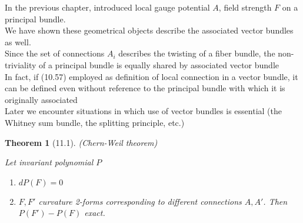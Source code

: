 \documentclass[twoside]{amsart}
\newtheorem{theorem}{Theorem}
\begin{document}
In the previous chapter, introduced local gauge potential $A$, field strength $F$ on a principal bundle.  \\
\quad We have shown these geometrical objects describe the associated vector bundles as well. \\
\quad Since the set of connections $A_i$ describes the twisting of a fiber bundle, the non-triviality of a principal bundle is equally shared by associated vector bundle \\
\quad \quad In fact, if (10.57) employed as definition of local connection in a vector bundle, it can be defined even without reference to the principal bundle with which it is originally associated \\
Later we encounter situations in which use of vector bundles is essential (the Whitney sum bundle, the splitting principle, etc.)

\begin{theorem}[11.1] (Chern-Weil theorem)

Let invariant polynomial $P$

\begin{enumerate}
\item[(a)] $dP(F) = 0$ 
\item[(b)] $F,F'$ curvature 2-forms corresponding to different connections $A, A'$.  Then $P(F')- P(F)$ exact.
\end{enumerate}
\end{theorem}
\end{document}
